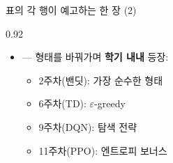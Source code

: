 \begin{frame}{표의 각 행이 예고하는 한 장 (2)}
\begin{center}\begin{varwidth}{0.92\textwidth}
  \begin{itemize}
    
    \item {} --- 형태를 바꿔가며 \textbf{학기 내내} 등장:
      \begin{itemize}
        \item 2주차(밴딧): 가장 순수한 형태
        \item 6주차(TD): $\varepsilon$-greedy
        \item 9주차(DQN): 탐색 전략
        \item 11주차(PPO): 엔트로피 보너스
      \end{itemize}
  \end{itemize}
\end{varwidth}\end{center}
\end{frame}
